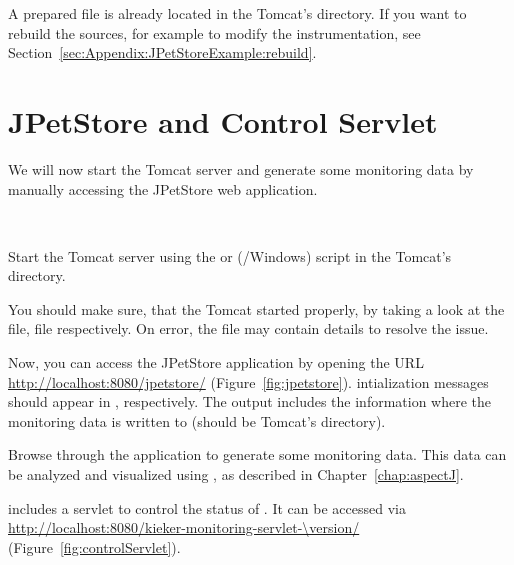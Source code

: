 \begin{compactenum}\setcounter{enumi}{4}
\item  A prepared  file is already located in the %
   Tomcat's  directory. If you want to rebuild the sources, %
   for example to modify the instrumentation, see Section~\ref{sec:Appendix:JPetStoreExample:rebuild}. 
\end{compactenum}


\section{JPetStore and \KiekerMonitoringPart{} Control Servlet}

\noindent We will now start the Tomcat server and generate some monitoring data by manually %
accessing the JPetStore web application. 

\

\enlargethispage{1.5cm}

\begin{compactenum}
\item Start the Tomcat server using the  or  (\UnixLikeSystems/Windows) %
   script in the Tomcat's  directory.

   You should make sure, that the Tomcat started properly, by taking 
   a look at the  file,  file respectively. %
   On error, the file  may contain details %
   to resolve the issue.
\item Now, you can access the JPetStore application by opening the URL
   \url{http://localhost:8080/jpetstore/} (Figure~\ref{fig:jpetstore}). %
   \Kieker{} intialization messages should appear in ,  respectively. %
   The output includes the information where the monitoring data is written to
   (should be Tomcat's  directory).
\item  Browse through the application to generate some monitoring data. %
   This data can be analyzed and visualized using \KiekerTraceAnalysis{}, %
   as described in Chapter~\ref{chap:aspectJ}.
\item \Kieker{} includes a servlet to control the status of \KiekerMonitoringPart{}. %
   It can be accessed via \url{http://localhost:8080/kieker-monitoring-servlet-\version/} %
   (Figure~\ref{fig:controlServlet}).
\end{compactenum}

